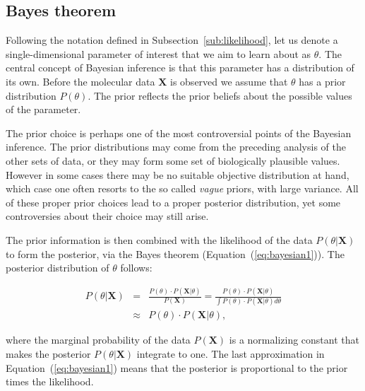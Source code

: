 \subsection{Bayes theorem\label{sub:bayesTheorem}}

Following the notation defined in Subsection~\ref{sub:likelihood}, let us denote a single-dimensional parameter of interest that we aim to learn about as $\theta$.
The central concept of Bayesian inference is that this parameter has a distribution of its own.
Before the molecular data $\mathbf{X}$ is observed we assume that $\theta$ has a prior distribution $P(\theta)$.
The prior reflects the prior beliefs about the possible values of the parameter.

The prior choice is perhaps one of the most controversial points of the Bayesian inference.
The prior distributions may come from the preceding analysis of the other sets of data, or they may form some set of biologically plausible values.
However in some cases there may be no suitable objective distribution at hand, which case one often resorts to the so called \emph{vague} priors, with large variance.
All of these proper prior choices lead to a proper posterior distribution, yet some controversies about their choice may still arise.

The prior information is then combined with the likelihood of the data $P\left(\theta|\mathbf{X}\right)$ to form the posterior, via the Bayes theorem (Equation~(\ref{eq:bayesian1})).
The posterior distribution of $\theta$ follows:

\begin{eqnarray}
P\left(\theta|\mathbf{X}\right) &=& \frac{P(\theta)\cdot P\left(\mathbf{X}|\theta\right)}{P\left(\mathbf{X}\right)}=\frac{P(\theta)\cdot P\left(\mathbf{X}|\theta\right)}{\int P(\theta)\cdot P\left(\mathbf{X}|\theta\right)d\theta} \\ \nonumber
& \approx & P(\theta)\cdot P\left(\mathbf{X}|\theta\right),
\label{eq:bayesian1}
\end{eqnarray}

\noindent
where the marginal probability of the data $P\left(\mathbf{X}\right)$ is a normalizing constant that makes the posterior $P\left(\theta|\mathbf{X}\right)$ integrate to one.
The last approximation in Equation~(\ref{eq:bayesian1}) means that the posterior is proportional to the prior times the likelihood.

